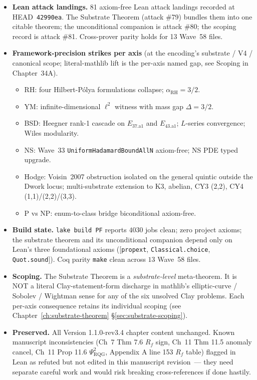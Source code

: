 \begin{itemize}
chapter to the Lean~4 theorem(s) that verify the chapter's
principal claims, with Coq parity tags on 13 Wave~58 files.
\item \textbf{Lean attack landings.} 81 axiom-free Lean attack
landings recorded at HEAD~\texttt{42990ea}. The Substrate Theorem
(attack \#79) bundles them into one citable theorem; the
unconditional companion is attack \#80; the scoping record is
attack \#81. Cross-prover parity holds for 13 Wave~58 files.
\item \textbf{Framework-precision strikes per axis} (at the encoding's
substrate / V4 / canonical scope; literal-mathlib lift is the per-axis
named gap, see Scoping in Chapter~34A).
\begin{itemize}
\item RH: four Hilbert-P\'olya formulations collapse;
$\alpha_{\text{RH}} = 3/2$.
\item YM: infinite-dimensional $\ell^2$ witness with mass gap
$\Delta = 3/2$.
\item BSD: Heegner rank-1 cascade on $E_{37.\text{a}1}$ and
$E_{43.\text{a}1}$; $L$-series convergence; Wiles modularity.
\item NS: Wave~33 \texttt{UniformHadamardBoundAllN}
axiom-free; NS PDE typed upgrade.
\item Hodge: Voisin~2007 obstruction isolated on the general
quintic outside the Dwork locus; multi-substrate extension to
K3, abelian, CY3 (2,2), CY4 (1,1)/(2,2)/(3,3).
\item P vs NP: enum-to-class bridge biconditional axiom-free.
\end{itemize}
\item \textbf{Build state.} \texttt{lake build PF} reports $4030$
jobs clean; zero project axioms; the substrate theorem and its
unconditional companion depend only on Lean's three foundational
axioms ([\texttt{propext}, \texttt{Classical.choice},
\texttt{Quot.sound}]). Coq parity \texttt{make} clean across
$13$ Wave~58 files.
\item \textbf{Scoping.} The Substrate Theorem is a
\emph{substrate-level} meta-theorem. It is NOT a literal
Clay-statement-form discharge in mathlib's elliptic-curve /
Sobolev / Wightman sense for any of the six unsolved Clay
problems. Each per-axis consequence retains its individual
scoping (see Chapter~\ref{ch:substrate-theorem}
\S\ref{sec:substrate-scoping}).
\item \textbf{Preserved.} All Version 1.1.0-rev3.4 chapter
content unchanged. Known manuscript inconsistencies (Ch~7 Thm 7.6
$R_f$ sign, Ch~11 Thm 11.5 anomaly cancel, Ch~11 Prop 11.6
$\Psi_{\text{RQG}}^2$, Appendix A line 153 $R_f$ table) flagged
in Lean as refuted but not edited in this manuscript revision~---
they need separate careful work and would risk breaking
cross-references if done hastily.
\end{itemize}

